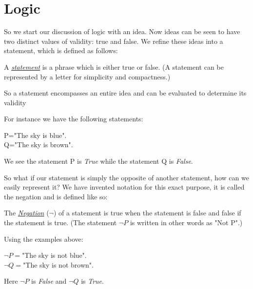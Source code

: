 \section{Logic}

So we start our discussion of logic with an idea.
Now ideas can be seen to have two distinct values of validity: true and false.
We refine these ideas into a statement, which is defined as follows:

\begin{defn}
    \label{defn:statement}
	A \underline{\emph{statement}} is a phrase which is either true or false. (A statement can be represented by a letter for simplicity and compactness.)
\end{defn}

So a statement encompasses an entire idea and can be evaluated to determine its validity

\begin{ex}
    For instance we have the following statements:
	\begin{center}
    P="The sky is blue".\\
	Q="The sky is brown".
    \end{center}
    We see the statement P is \emph{True} while the statement Q is \emph{False}.
\end{ex}

So what if our statement is simply the opposite of another statement, how can we easily represent it?
We have invented notation for this exact purpose, it is called the negation and is defined like so:

\begin{defn}
	The \underline{\emph{Negation}} ($\neg$) of a statement is true when the statement is false and false if the statement is true.
	(The statement $\neg P$ is written in other words as "Not P".)
\end{defn}

\begin{ex}
    Using the examples above:
    \begin{center}
	$\neg P=$"The sky is not blue".\\
	$\neg Q=$"The sky is not brown".
    \end{center}
    Here $\neg P$ is \emph{False} and $\neg Q$ is \emph{True}.
\end{ex}


